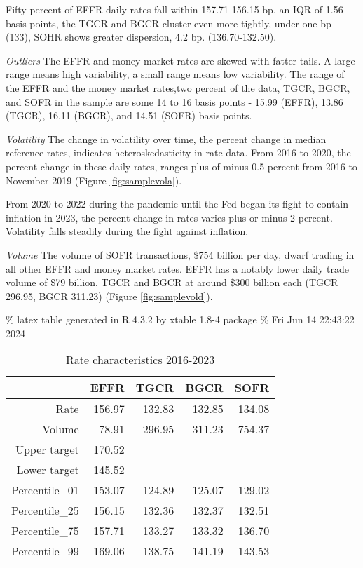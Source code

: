 \documentclass[
]{article}
\begin{document}
Fifty percent of EFFR daily rates fall within 157.71-156.15 bp, an IQR of 1.56 basis points, the TGCR and BGCR cluster even more tightly, under one bp (133), SOHR shows greater dispersion, 4.2 bp. (136.70-132.50).

\emph{Outliers}
The EFFR and money market rates are skewed with fatter tails. A large range means high variability, a small range means low variability. The range of the EFFR and the money market rates,two percent of the data, TGCR, BGCR, and SOFR in the sample are some 14 to 16 basis points - 15.99 (EFFR), 13.86 (TGCR), 16.11 (BGCR), and 14.51 (SOFR) basis points.

\emph{Volatility}
The change in volatility over time, the percent change in median reference rates, indicates heteroskedasticity in rate data. From 2016 to 2020, the percent change in these daily rates, ranges plus of minus 0.5 percent from 2016 to November 2019 (Figure \ref{fig:samplevola}).

From 2020 to 2022 during the pandemic until the Fed began its fight to contain inflation in 2023, the percent change in rates varies plus or minus 2 percent. Volatility falls steadily during the fight against inflation.

\emph{Volume}
The volume of SOFR transactions, \$754 billion per day, dwarf trading in all other EFFR and money market rates. EFFR has a notably lower daily trade volume of \$79 billion, TGCR and BGCR at around \$300 billion each (TGCR 296.95, BGCR 311.23) (Figure \ref{fig:samplevold}).

\% latex table generated in R 4.3.2 by xtable 1.8-4 package
\% Fri Jun 14 22:43:22 2024

\begin{table}[ht]
\centering
\begin{tabular}{rrrrr}
  \hline
 & EFFR & TGCR & BGCR & SOFR \\ 
  \hline
Rate & 156.97 & 132.83 & 132.85 & 134.08 \\ 
  Volume & 78.91 & 296.95 & 311.23 & 754.37 \\ 
  Upper target & 170.52 &  &  &  \\ 
  Lower target & 145.52 &  &  &  \\ 
  Percentile\_01 & 153.07 & 124.89 & 125.07 & 129.02 \\ 
  Percentile\_25 & 156.15 & 132.36 & 132.37 & 132.51 \\ 
  Percentile\_75 & 157.71 & 133.27 & 133.32 & 136.70 \\ 
  Percentile\_99 & 169.06 & 138.75 & 141.19 & 143.53 \\ 
   \hline
\end{tabular}
\caption{Rate characteristics 2016-2023} 
\label{tab:Rate characteristics 2016-2023}
\end{table}
\end{document}
